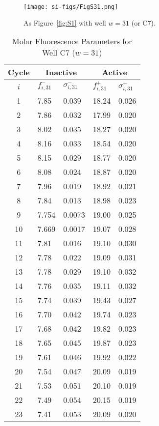                 \begin{figure}
                    \centering
                    \texttt{[image: si-figs/FigS31.png]}
                    \caption{
                        As Figure~\ref{fig:S1} with well $w=31$ (or C7).
                    }
                \end{figure}
                \clearpage
    \begin{table}
        \caption{Molar Fluorescence Parameters for Well C7 ($w=31$)}
        \centering
        \begin{tabular}{c|ll|ll}
            Cycle & \multicolumn{2}{c|}{Inactive} & \multicolumn{2}{c}{Active} \\
            \hline
            $i$ & $f_{i,31}^{-}$ & $\sigma_{i,31}^{-}$ &  $f_{i,31}^{+}$ & $\sigma_{i,31}^{+}$ \\
            \hline
    1 & 7.85 & 0.039 & 18.24 & 0.026 \\
2 & 7.86 & 0.032 & 17.99 & 0.020 \\
3 & 8.02 & 0.035 & 18.27 & 0.020 \\
4 & 8.16 & 0.033 & 18.54 & 0.020 \\
5 & 8.15 & 0.029 & 18.77 & 0.020 \\
6 & 8.08 & 0.024 & 18.87 & 0.020 \\
7 & 7.96 & 0.019 & 18.92 & 0.021 \\
8 & 7.84 & 0.013 & 18.98 & 0.023 \\
9 & 7.754 & 0.0073 & 19.00 & 0.025 \\
10 & 7.669 & 0.0017 & 19.07 & 0.028 \\
11 & 7.81 & 0.016 & 19.10 & 0.030 \\
12 & 7.78 & 0.022 & 19.09 & 0.031 \\
13 & 7.78 & 0.029 & 19.10 & 0.032 \\
14 & 7.76 & 0.035 & 19.11 & 0.032 \\
15 & 7.74 & 0.039 & 19.43 & 0.027 \\
16 & 7.70 & 0.042 & 19.74 & 0.023 \\
17 & 7.68 & 0.042 & 19.82 & 0.023 \\
18 & 7.65 & 0.045 & 19.87 & 0.023 \\
19 & 7.61 & 0.046 & 19.92 & 0.022 \\
20 & 7.54 & 0.047 & 20.09 & 0.019 \\
21 & 7.53 & 0.051 & 20.10 & 0.019 \\
22 & 7.49 & 0.054 & 20.15 & 0.019 \\
23 & 7.41 & 0.053 & 20.09 & 0.020 \\

\end{tabular}
\end{table}
